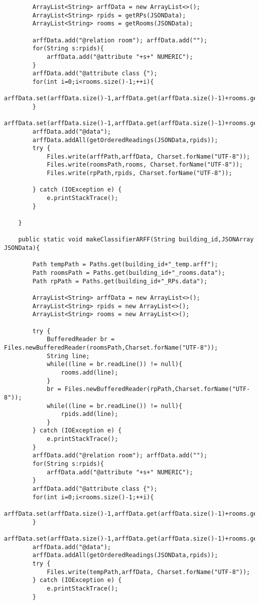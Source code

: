 \begin{lstlisting}
        ArrayList<String> arffData = new ArrayList<>();
        ArrayList<String> rpids = getRPs(JSONData);
        ArrayList<String> rooms = getRooms(JSONData);

        arffData.add("@relation room"); arffData.add("");
        for(String s:rpids){
            arffData.add("@attribute "+s+" NUMERIC");
        }
        arffData.add("@attribute class {");
        for(int i=0;i<rooms.size()-1;++i){
            arffData.set(arffData.size()-1,arffData.get(arffData.size()-1)+rooms.get(i)+",");
        }
        arffData.set(arffData.size()-1,arffData.get(arffData.size()-1)+rooms.get(rooms.size()-1)+"}");
        arffData.add("@data");
        arffData.addAll(getOrderedReadings(JSONData,rpids));
        try {
            Files.write(arffPath,arffData, Charset.forName("UTF-8"));
            Files.write(roomsPath,rooms, Charset.forName("UTF-8"));
            Files.write(rpPath,rpids, Charset.forName("UTF-8"));

        } catch (IOException e) {
            e.printStackTrace();
        }

    }

    public static void makeClassifierARFF(String building_id,JSONArray JSONData){

        Path tempPath = Paths.get(building_id+"_temp.arff");
        Path roomsPath = Paths.get(building_id+"_rooms.data");
        Path rpPath = Paths.get(building_id+"_RPs.data");

        ArrayList<String> arffData = new ArrayList<>();
        ArrayList<String> rpids = new ArrayList<>();
        ArrayList<String> rooms = new ArrayList<>();

        try {
            BufferedReader br = Files.newBufferedReader(roomsPath,Charset.forName("UTF-8"));
            String line;
            while((line = br.readLine()) != null){
                rooms.add(line);
            }
            br = Files.newBufferedReader(rpPath,Charset.forName("UTF-8"));
            while((line = br.readLine()) != null){
                rpids.add(line);
            }
        } catch (IOException e) {
            e.printStackTrace();
        }
        arffData.add("@relation room"); arffData.add("");
        for(String s:rpids){
            arffData.add("@attribute "+s+" NUMERIC");
        }
        arffData.add("@attribute class {");
        for(int i=0;i<rooms.size()-1;++i){
            arffData.set(arffData.size()-1,arffData.get(arffData.size()-1)+rooms.get(i)+",");
        }
        arffData.set(arffData.size()-1,arffData.get(arffData.size()-1)+rooms.get(rooms.size()-1)+"}");
        arffData.add("@data");
        arffData.addAll(getOrderedReadings(JSONData,rpids));
        try {
            Files.write(tempPath,arffData, Charset.forName("UTF-8"));
        } catch (IOException e) {
            e.printStackTrace();
        }


\end{lstlisting}
